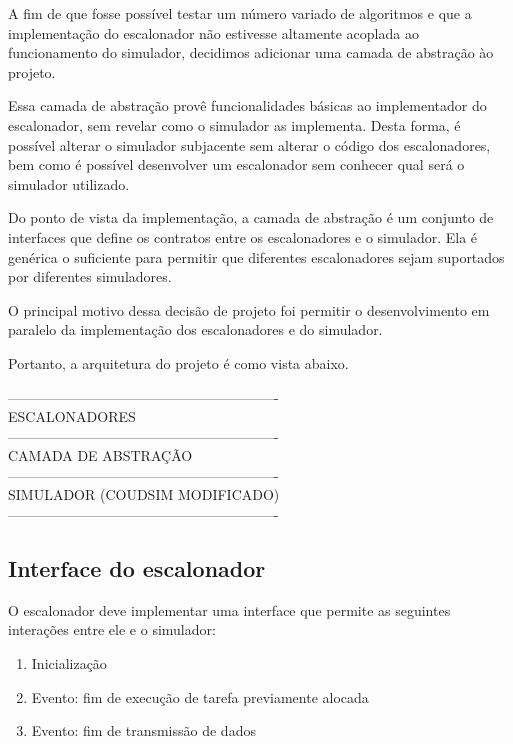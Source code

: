 \documentclass[a4paper,10pt]{article}
\begin{document}
A fim de que fosse possível testar um número variado de algoritmos e que a implementação do escalonador
não estivesse altamente acoplada ao funcionamento do simulador, decidimos adicionar uma camada de abstração
ào projeto.

Essa camada de abstração provê funcionalidades básicas ao implementador do escalonador, sem revelar como o
simulador as implementa. Desta forma, é possível alterar o simulador subjacente sem alterar o código dos escalonadores,
bem como é possível desenvolver um escalonador sem conhecer qual será o simulador utilizado.

Do ponto de vista da implementação, a camada de abstração é um conjunto de interfaces que define os contratos
entre os escalonadores e o simulador.
Ela é genérica o suficiente para permitir que diferentes escalonadores sejam suportados por diferentes simuladores.

O principal motivo dessa decisão de projeto foi permitir o desenvolvimento em paralelo da implementação dos escalonadores
e do simulador.

Portanto, a arquitetura do projeto é como vista abaixo.

\begin{center}
----------------------------------------------------------\\
                ESCALONADORES                 \\
----------------------------------------------------------\\
             CAMADA DE ABSTRAÇÃO              \\
----------------------------------------------------------\\
        SIMULADOR (COUDSIM MODIFICADO)        \\
----------------------------------------------------------\\
\end{center}

\subsection{Interface do escalonador}

O escalonador deve implementar uma interface que permite as seguintes
interações entre ele e o simulador:

\begin{enumerate}

  \item Inicialização
  \item Evento: fim de execução de tarefa previamente alocada
  \item Evento: fim de transmissão de dados

\end{enumerate}
\end{document}
